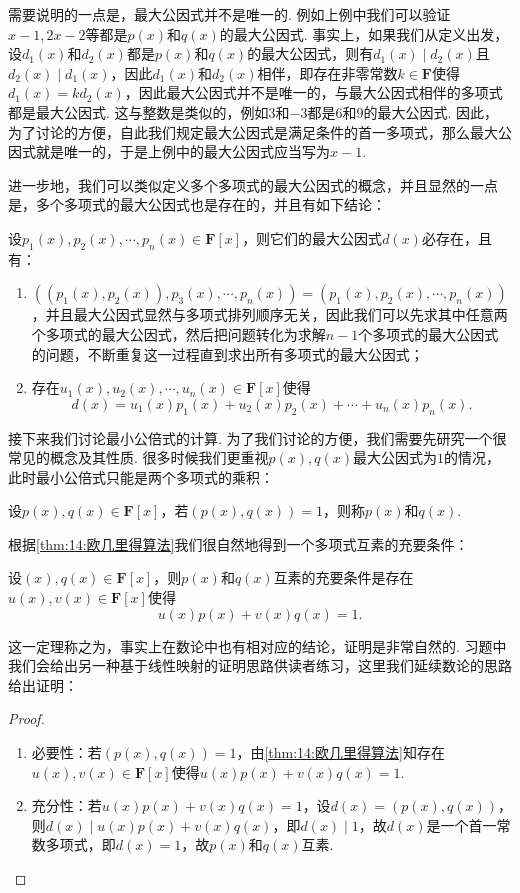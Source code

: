 需要说明的一点是，最大公因式并不是唯一的. 例如上例中我们可以验证$x-1,2x-2$等都是$p(x)$和$q(x)$的最大公因式. 事实上，如果我们从定义出发，设$d_1(x)$和$d_2(x)$都是$p(x)$和$q(x)$的最大公因式，则有$d_1(x)\mid d_2(x)$且$d_2(x)\mid d_1(x)$，因此$d_1(x)$和$d_2(x)$相伴，即存在非零常数$k\in\mathbf{F}$使得$d_1(x)=kd_2(x)$，因此最大公因式并不是唯一的，与最大公因式相伴的多项式都是最大公因式. 这与整数是类似的，例如$3$和$-3$都是$6$和$9$的最大公因式. 因此，为了讨论的方便，自此我们规定最大公因式是满足条件的首一多项式，那么最大公因式就是唯一的，于是上例中的最大公因式应当写为$x-1$.

进一步地，我们可以类似定义多个多项式的最大公因式的概念，并且显然的一点是，多个多项式的最大公因式也是存在的，并且有如下结论：
\begin{theorem}
    设$p_1(x),p_2(x),\cdots,p_n(x)\in\mathbf{F}[x]$，则它们的最大公因式$d(x)$必存在，且有：
    \begin{enumerate}
        \item $((p_1(x),p_2(x)),p_3(x),\cdots,p_n(x))=(p_1(x),p_2(x),\cdots,p_n(x))$，并且最大公因式显然与多项式排列顺序无关，因此我们可以先求其中任意两个多项式的最大公因式，然后把问题转化为求解$n-1$个多项式的最大公因式的问题，不断重复这一过程直到求出所有多项式的最大公因式；
        \item 存在$u_1(x),u_2(x),\cdots,u_n(x)\in\mathbf{F}[x]$使得
        \[d(x)=u_1(x)p_1(x)+u_2(x)p_2(x)+\cdots+u_n(x)p_n(x).\]
    \end{enumerate}
\end{theorem}

接下来我们讨论最小公倍式的计算. 为了我们讨论的方便，我们需要先研究一个很常见的概念及其性质. 很多时候我们更重视$p(x),q(x)$最大公因式为$1$的情况，此时最小公倍式只能是两个多项式的乘积：
\begin{definition}
    设$p(x),q(x)\in\mathbf{F}[x]$，若$(p(x),q(x))=1$，则称$p(x)$和$q(x)$.
\end{definition}
根据\autoref{thm:14:欧几里得算法}我们很自然地得到一个多项式互素的充要条件：
\begin{theorem}\label{thm:14:裴蜀定理}
    设$(x),q(x)\in\mathbf{F}[x]$，则$p(x)$和$q(x)$互素的充要条件是存在$u(x),v(x)\in\mathbf{F}[x]$使得\[u(x)p(x)+v(x)q(x)=1.\]
\end{theorem}
这一定理称之为，事实上在数论中也有相对应的结论，证明是非常自然的. 习题中我们会给出另一种基于线性映射的证明思路供读者练习，这里我们延续数论的思路给出证明：
\begin{proof}
    \begin{enumerate}
        \item 必要性：若$(p(x),q(x))=1$，由\autoref{thm:14:欧几里得算法}知存在$u(x),v(x)\in\mathbf{F}[x]$使得$u(x)p(x)+v(x)q(x)=1$.
        \item 充分性：若$u(x)p(x)+v(x)q(x)=1$，设$d(x)=(p(x),q(x))$，则$d(x)\mid u(x)p(x)+v(x)q(x)$，即$d(x)\mid 1$，故$d(x)$是一个首一常数多项式，即$d(x)=1$，故$p(x)$和$q(x)$互素.
    \end{enumerate}
\end{proof}

